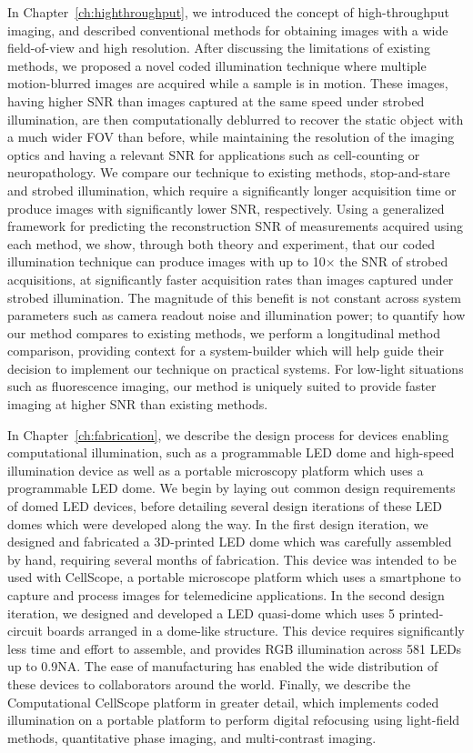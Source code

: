 In Chapter~\ref{ch:highthroughput}, we introduced the concept of high-throughput imaging, and described conventional methods for obtaining images with a wide field-of-view and high resolution. After discussing the limitations of existing methods, we proposed a novel coded illumination technique where multiple motion-blurred images are acquired while a sample is in motion. These images, having higher SNR than images captured at the same speed under strobed illumination, are then computationally deblurred to recover the static object with a much wider FOV than before, while maintaining the resolution of the imaging optics and having a relevant SNR for applications such as cell-counting or neuropathology. We compare our technique to existing methods, stop-and-stare and strobed illumination, which require a significantly longer acquisition time or produce images with significantly lower SNR, respectively. Using a generalized framework for predicting the reconstruction SNR of measurements acquired using each method, we show, through both theory and experiment, that our coded illumination technique can produce images with up to 10$\times$ the SNR of strobed acquisitions, at significantly faster acquisition rates than images captured under strobed illumination. The magnitude of this benefit is not constant across system parameters such as camera readout noise and illumination power; to quantify how our method compares to existing methods, we perform a longitudinal method comparison, providing context for a system-builder which will help guide their decision to implement our technique on practical systems. For low-light situations such as fluorescence imaging, our method is uniquely suited to provide faster imaging at higher SNR than existing methods.

In Chapter~\ref{ch:fabrication}, we describe the design process for devices enabling computational illumination, such as a programmable LED dome and high-speed illumination device as well as a portable microscopy platform which uses a programmable LED dome. We begin by laying out common design requirements of domed LED devices, before detailing several design iterations of these LED domes which were developed along the way. In the first design iteration, we designed and fabricated a 3D-printed LED dome which was carefully assembled by hand, requiring several months of fabrication. This device was intended to be used with CellScope, a portable microscope platform which uses a smartphone to capture and process images for telemedicine applications. In the second design iteration, we designed and developed a LED quasi-dome which uses 5 printed-circuit boards arranged in a dome-like structure. This device requires significantly less time and effort to assemble, and provides RGB illumination across 581 LEDs up to 0.9NA. The ease of manufacturing has enabled the wide distribution of these devices to collaborators around the world. Finally, we describe the Computational CellScope platform in greater detail, which implements coded illumination on a portable platform to perform digital refocusing using light-field methods, quantitative phase imaging, and multi-contrast imaging.

